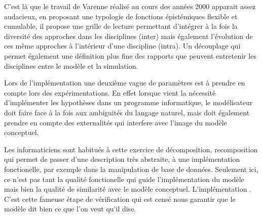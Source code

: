 

C'est là que le travail de Varenne réalisé au cours des années 2000 \autocites{Varenne2008, Varenne2013} apparait assez audacieux, en proposant une typologie de fonctions épistémiques flexible et cumulable, il propose une grille de lecture permettant d'intégrer à la fois la diversité des approches dans les disciplines (inter) mais également l'évolution de ces même approches à l'intérieur d'une discipline (intra). Un découplage qui permet également une définition plus fine des rapports que peuvent entretenir les disciplines entre le modèle et la simulation.









Lors de l'implémentation une deuxième vague de paramètres est à prendre en compte lors des expérimentations. En effet lorsque vient la nécessité d'implémenter les hypothèses dans un programme informatique, le modélisateur doit faire face à la fois aux ambiguités du langage naturel, mais doit également prendre en compte des externalités qui interfere avec l'image du modèle conceptuel.

Les informaticiens sont habitués à cette exercice de décomposition, recomposition qui permet de passer d'une description très abstraite, à une implémentation fonctionelle, par exemple dans la manipulation de base de données. Seulement ici, ce n'est pas tant la qualité fonctionelle qui guide l'implémentation du modèle mais bien la qualité de similarité avec le modèle conceptuel. L'implémentation . C'est cette fameuse étape de vérification qui est censé nous garantir que le modèle dit bien ce que l'on veut qu'il dise.

